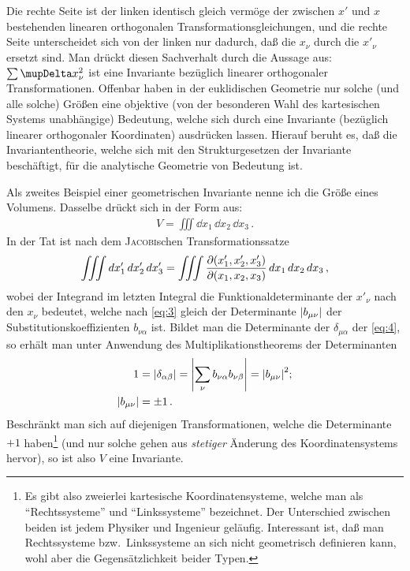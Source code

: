 Die rechte Seite ist der linken identisch gleich vermöge der zwischen $x'$ und 
$x$ bestehenden linearen orthogonalen Transformationsgleichungen, und die 
rechte Seite unterscheidet sich von der linken nur dadurch, daß die $x_{\nu}$ 
durch die $x'_{\nu}$ ersetzt sind. Man drückt diesen Sachverhalt durch die 
Aussage aus: $\sum \Dva x_{\nu}^2$ ist eine Invariante bezüglich linearer 
orthogonaler Transformationen. Offenbar haben in der euklidischen Geometrie nur 
solche (und alle solche) Größen eine objektive (von der besonderen Wahl des 
kartesischen Systems unabhängige) Bedeutung, welche sich durch eine Invariante
(bezüglich linearer orthogonaler Koordinaten) ausdrücken lassen. Hierauf beruht 
es, daß die Invariantentheorie, welche sich mit den Strukturgesetzen der 
Invariante beschäftigt, für die analytische Geometrie von Bedeutung ist.

Als zweites Beispiel einer geometrischen Invariante nenne ich die Größe eines 
Volumens. Dasselbe drückt sich in der Form aus:
\begin{align*}
	V = \iiint \dd x_1\,\dd x_2\,\dd x_3\,.
\end{align*}
In der Tat ist nach dem \textsc{Jacobi}schen Transformationssatze
\begin{align*}
\iiint d x'_{1}\, d x'_{2}\, d x'_{3} = \iiint 
	{\frac{\partial{{\left(x'_{1}, x'_{2}, x'_{3}\right)}}}{\partial{{\left(x_{1}, x_{2}, x_{3}\right)}}}}\,
	d x_1\,d x_2\,d x_3\,,
\end{align*}
wobei der Integrand im letzten Integral die Funktionaldeterminante der 
$x'_{\nu}$ nach den $x_{\nu}$ bedeutet, welche nach \eqref{eq:3} gleich der 
Determinante ${\left|b_{\mu\nu}\right|}$ der Substitutionskoeffizienten $b_{\nu\alpha}$ 
ist. Bildet man die Determinante der $\delta_{\mu\alpha}$ der \cref{eq:4}, so 
erhält man unter Anwendung des Multiplikationstheorems der Determinanten
\begin{align}
\begin{aligned}
1 &= {\left|\delta_{\alpha\beta}\right|} = {\left|\sum_{\nu} b_{\nu\alpha} b_{\nu\beta}\right|}
= {\left|b_{\mu\nu}\right|}^2; \\
{\left|b_{\mu\nu}\right|} &= \pm 1\, .
\end{aligned}
\label{eq:6}
\end{align}
Beschränkt man sich auf diejenigen Transformationen, welche die Determinante 
$+1$ haben\footnote{Es gibt also zweierlei kartesische Koordinatensysteme,
welche man als \enquote{Rechtssysteme} und \enquote{Linkssysteme} bezeichnet. 
Der Unterschied zwischen beiden ist jedem Physiker und Ingenieur geläufig. 
Interessant ist, daß man Rechtssysteme bzw.\ Linkssysteme an sich nicht 
geometrisch definieren kann, wohl aber die Gegensätzlichkeit beider Typen.} 
(und nur solche gehen aus \emph{stetiger} Änderung des Koordinatensystems 
hervor), so ist also $V$ eine Invariante.

